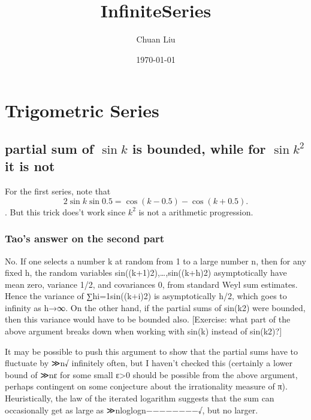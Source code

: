 \documentclass[11pt]{article}
\author{Chuan Liu}
\date{\today}
\title{InfiniteSeries}
\begin{document}
\maketitle
\tableofcontents

\section{Trigometric Series}
\label{sec-1}
\subsection{partial sum of $\sin{k}$ is bounded, while for $\sin{k^2}$ it is not}
\label{sec-1-1}
 For the first series, note that
\[
2\sin{k}\sin{0.5}=\cos(k - 0.5) \minus \cos(k + 0.5).
\].
But this trick does't work since $k^2$ is  not a arithmetic progression.
\subsubsection{Tao's answer on the second part}
\label{sec-1-1-1}
No. If one selects a number k at random from 1 to a large number n,
then for any fixed h, the random variables sin((k+1)2),…,sin((k+h)2)
asymptotically have mean zero, variance 1/2, and covariances 0, from
standard Weyl sum estimates. Hence the variance of ∑hi=1sin((k+i)2) is
asymptotically h/2, which goes to infinity as h→∞. On the other hand,
if the partial sums of sin(k2) were bounded, then this variance would
have to be bounded also. [Exercise: what part of the above argument
breaks down when working with sin(k) instead of sin(k2)?]

It may be possible to push this argument to show that the partial sums
have to fluctuate by ≫n√ infinitely often, but I haven't checked this
(certainly a lower bound of ≫nε for some small ε>0 should be possible
from the above argument, perhaps contingent on some conjecture about
the irrationality measure of π). Heuristically, the law of the
iterated logarithm suggests that the sum can occasionally get as large
as ≫nloglogn−−−−−−−−√, but no larger.
\end{document}
